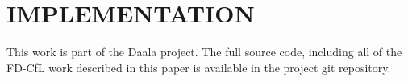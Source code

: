 \documentclass[a4paper]{spie}  %
\begin{document}
\section{IMPLEMENTATION}

This work is part of the Daala project\cite{DaalaWebsite}.
The full source code, including all of the FD-CfL work described in this paper
 is available in the project git repository\cite{DaalaGit}.



\end{document}
